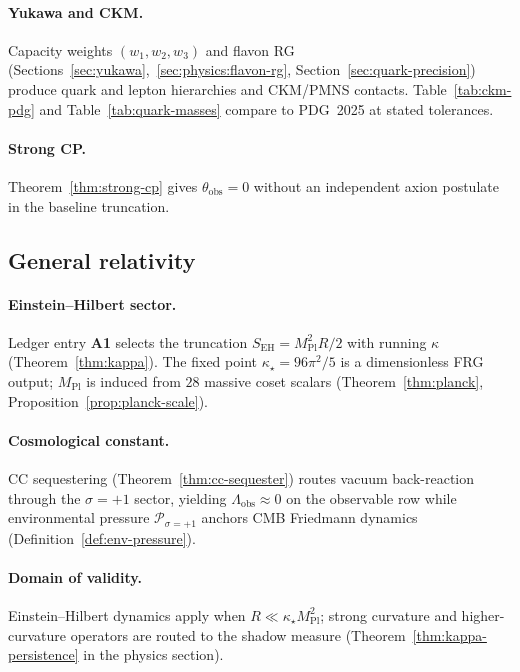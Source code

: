 \documentclass[11pt]{article}
\theoremstyle{plain}
\theoremstyle{definition}
\theoremstyle{remark}
\numberwithin{equation}{section}
\newcommand{\MPl}{M_{\mathrm{Pl}}}
\begin{document}
\paragraph{Yukawa and CKM.}
Capacity weights $(w_1,w_2,w_3)$ and flavon RG
(Sections~\ref{sec:yukawa},~\ref{sec:physics:flavon-rg},
Section~\ref{sec:quark-precision}) produce quark and lepton hierarchies and
CKM/PMNS contacts. Table~\ref{tab:ckm-pdg} and Table~\ref{tab:quark-masses}
compare to PDG~2025 at stated tolerances.

\paragraph{Strong CP.}
Theorem~\ref{thm:strong-cp} gives $\theta_{\mathrm{obs}}=0$ without an
independent axion postulate in the baseline truncation.

\subsection{General relativity}
\label{sec:standard-theories:gr}

\paragraph{Einstein--Hilbert sector.}
Ledger entry \textbf{A1} selects the truncation $S_{\mathrm{EH}}=\MPl^2 R/2$
with running $\kappa$ (Theorem~\ref{thm:kappa}). The fixed point
$\kappa_\star=96\pi^2/5$ is a dimensionless FRG output; $\MPl$ is induced from
$28$ massive coset scalars (Theorem~\ref{thm:planck}, Proposition~\ref{prop:planck-scale}).

\paragraph{Cosmological constant.}
CC sequestering (Theorem~\ref{thm:cc-sequester}) routes vacuum back-reaction
through the $\sigma=+1$ sector, yielding $\Lambda_{\mathrm{obs}}\approx 0$ on
the observable row while environmental pressure $\mathcal{P}_{\sigma=+1}$
anchors CMB Friedmann dynamics (Definition~\ref{def:env-pressure}).

\paragraph{Domain of validity.}
Einstein--Hilbert dynamics apply when $R\ll\kappa_\star\MPl^2$; strong
curvature and higher-curvature operators are routed to the shadow measure
(Theorem~\ref{thm:kappa-persistence} in the physics section).
\end{document}
